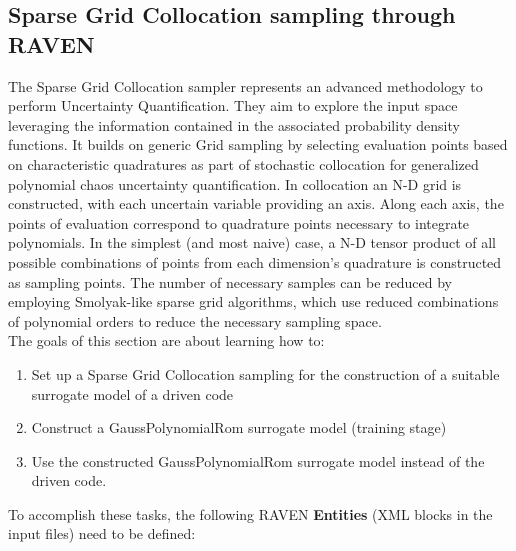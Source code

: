 \subsection{Sparse Grid Collocation sampling through RAVEN}
\label{sub:SGcsamplingExample}
The Sparse Grid Collocation sampler represents an advanced methodology to perform Uncertainty Quantification. They aim
to explore the input space leveraging the information contained in the associated probability density functions. It builds on generic Grid sampling by selecting evaluation points based on characteristic quadratures as part of stochastic collocation for generalized polynomial chaos uncertainty quantification. In collocation an N-D grid is constructed, with each uncertain variable providing an axis. Along each axis, the points of evaluation correspond to quadrature points necessary to integrate polynomials. In the simplest (and most naive) case, a N-D tensor product of all possible combinations of points from each dimension’s quadrature is constructed as sampling points. The number of necessary samples can be reduced by employing Smolyak-like sparse grid algorithms, which use reduced combinations of polynomial orders to reduce the necessary sampling space.
\\The goals of this section are about learning how to:
 \begin{enumerate}
   \item Set up a Sparse Grid Collocation sampling for the construction of a suitable surrogate model of a driven code
   \item Construct a GaussPolynomialRom surrogate model (training stage)
   \item Use the constructed GaussPolynomialRom surrogate model instead of the driven code.
\end{enumerate}
To accomplish these tasks, the following RAVEN \textbf{Entities} (XML blocks in the input files) need to be defined:
